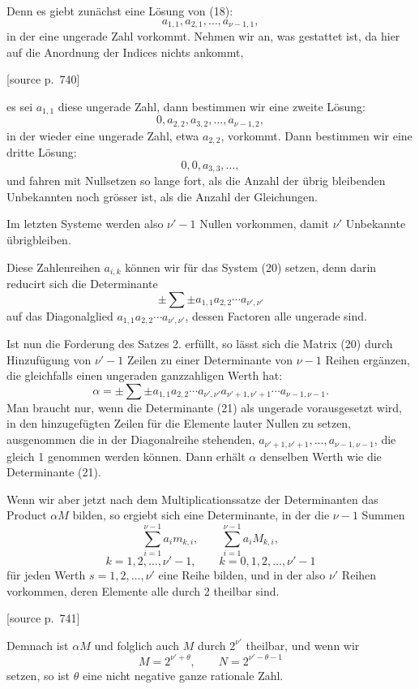 \documentclass[11pt]{article}
\newcommand{\srcpage}[1]{\par\medskip\noindent\textsf{[source p.~#1]}\par\smallskip}
\begin{document}
Denn es giebt zunächst eine Lösung von (18):
\[
a_{1,1},a_{2,1},\ldots,a_{\nu-1,1},
\]
in der eine ungerade Zahl vorkommt. Nehmen wir an, was gestattet ist, da hier auf die Anordnung der Indices nichts ankommt,
\srcpage{740}
es sei $a_{1,1}$ diese ungerade Zahl, dann bestimmen wir eine zweite Lösung:
\[
0,a_{2,2},a_{3,2},\ldots,a_{\nu-1,2},
\]
in der wieder eine ungerade Zahl, etwa $a_{2,2}$, vorkommt. Dann bestimmen wir eine dritte Lösung:
\[
0,0,a_{3,3},\ldots,
\]
und fahren mit Nullsetzen so lange fort, als die Anzahl der übrig bleibenden Unbekannten noch grösser ist, als die Anzahl der Gleichungen.

Im letzten Systeme werden also $\nu'-1$ Nullen vorkommen, damit $\nu'$ Unbekannte übrigbleiben.

Diese Zahlenreihen $a_{i,k}$ können wir für das System (20) setzen, denn darin reducirt sich die Determinante
\begin{equation}
\pm\sum\pm a_{1,1}a_{2,2}\cdots a_{\nu',\nu'}
\tag{21}
\end{equation}
auf das Diagonalglied $a_{1,1}a_{2,2}\cdots a_{\nu',\nu'}$, dessen Factoren alle ungerade sind.

Ist nun die Forderung des Satzes 2. erfüllt, so lässt sich die Matrix (20) durch Hinzufügung von $\nu'-1$ Zeilen zu einer Determinante von $\nu-1$ Reihen ergänzen, die gleichfalls einen ungeraden ganzzahligen Werth hat:
\begin{equation}
\alpha=\pm\sum\pm a_{1,1}a_{2,2}\cdots a_{\nu',\nu'}a_{\nu'+1,\nu'+1}\cdots a_{\nu-1,\nu-1}.
\tag{22}
\end{equation}
Man braucht nur, wenn die Determinante (21) als ungerade vorausgesetzt wird, in den hinzugefügten Zeilen für die Elemente lauter Nullen zu setzen, ausgenommen die in der Diagonalreihe stehenden, $a_{\nu'+1,\nu'+1},\ldots,a_{\nu-1,\nu-1}$, die gleich 1 genommen werden können. Dann erhält $\alpha$ denselben Werth wie die Determinante (21).

Wenn wir aber jetzt nach dem Multiplicationssatze der Determinanten das Product $\alpha M$ bilden, so ergiebt sich eine Determinante, in der die $\nu-1$ Summen
\[
\sum_{i=1}^{\nu-1}a_i m_{k,i},
\qquad
\sum_{i=1}^{\nu-1}a_i M_{k,i},
\]
\[
k=1,2,\ldots,\nu'-1,
\qquad
k=0,1,2,\ldots,\nu'-1
\]
für jeden Werth $s=1,2,\ldots,\nu'$ eine Reihe bilden, und in der also $\nu'$ Reihen vorkommen, deren Elemente alle durch 2 theilbar sind.

\srcpage{741}
Demnach ist $\alpha M$ und folglich auch $M$ durch $2^{\nu'}$ theilbar, und wenn wir
\begin{equation}
M=2^{\nu'+\theta},\qquad N=2^{\nu'-\theta-1}
\tag{23}
\end{equation}
setzen, so ist $\theta$ eine nicht negative ganze rationale Zahl.
\end{document}
